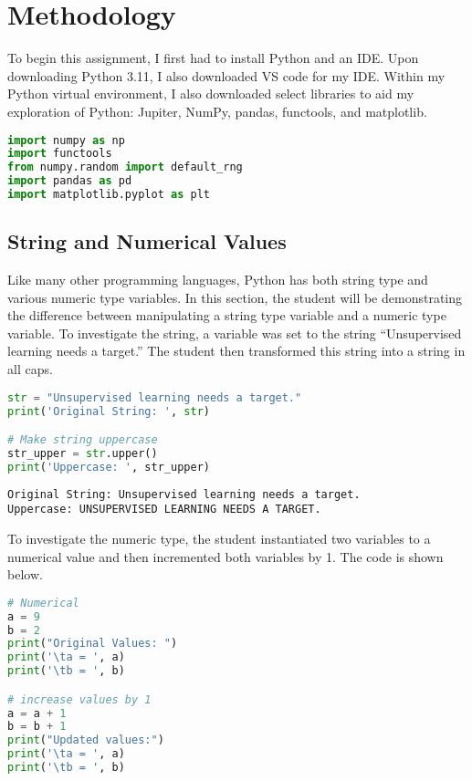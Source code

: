 \documentclass[journal]{IEEEtran}
\begin{document}
\section{Methodology}
To begin this assignment, I first had to install Python and an IDE. Upon downloading Python 3.11, I also downloaded VS code for my IDE. Within my Python virtual environment, I also downloaded select libraries to aid my exploration of Python: Jupiter, NumPy, pandas, functools, and matplotlib. 
\begin{lstlisting}[language=Python, caption=Libraries used for this assignment.]
import numpy as np
import functools
from numpy.random import default_rng
import pandas as pd
import matplotlib.pyplot as plt
\end{lstlisting}

\subsection{String and Numerical Values}

Like many other programming languages, Python has both string type and various numeric type variables. In this section, the student will be demonstrating the difference between manipulating a string type variable and a numeric type variable. 
To investigate the string, a variable was set to the string “Unsupervised learning needs a target.” The student then transformed this string into a string in all caps. 
\begin{lstlisting}[language=Python, caption={Converting a String to Uppercase.}]
str = "Unsupervised learning needs a target."
print('Original String: ', str)

# Make string uppercase
str_upper = str.upper()
print('Uppercase: ', str_upper)
\end{lstlisting}

\begin{lstlisting}[caption={String Investigation Ouput}]
Original String: Unsupervised learning needs a target.
Uppercase: UNSUPERVISED LEARNING NEEDS A TARGET.
\end{lstlisting}


To investigate the numeric type, the student instantiated two variables to a numerical value and then incremented both variables by 1. The code is shown below.
\begin{lstlisting}[language=Python, caption={Modifying Numerical Values}]
# Numerical 
a = 9
b = 2
print("Original Values: ")
print('\ta = ', a) 
print('\tb = ', b)

# increase values by 1
a = a + 1
b = b + 1
print("Updated values:")
print('\ta = ', a) 
print('\tb = ', b)
\end{lstlisting}
\end{document}
